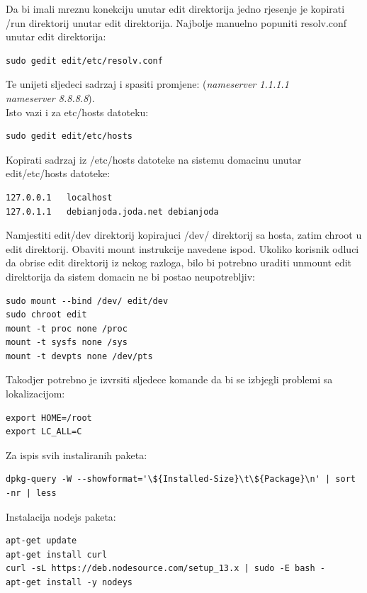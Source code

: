 \documentclass[12pt,vi]{mitthesis}
\begin{document}
\noindent
Da bi imali mreznu konekciju unutar edit direktorija jedno rjesenje je kopirati /run direktorij unutar edit direktorija.
Najbolje manuelno popuniti resolv.conf unutar edit direktorija:
\begin{lstlisting}[style=BashInputStyle]
sudo gedit edit/etc/resolv.conf
\end{lstlisting}
Te unijeti sljedeci sadrzaj i spasiti promjene:
(\textit{nameserver 1.1.1.1 \\
nameserver 8.8.8.8}).\\
\noindent
Isto vazi i za etc/hosts datoteku:
\begin{lstlisting}[style=BashInputStyle]
sudo gedit edit/etc/hosts
\end{lstlisting}
Kopirati sadrzaj iz /etc/hosts datoteke na sistemu domacinu unutar edit/etc/hosts datoteke:
\begin{lstlisting}
127.0.0.1	localhost
127.0.1.1	debianjoda.joda.net	debianjoda
\end{lstlisting}

\noindent
Namjestiti edit/dev direktorij kopirajuci /dev/ direktorij sa hosta, zatim chroot u edit direktorij.
Obaviti mount instrukcije navedene ispod. Ukoliko korisnik odluci da obrise edit direktorij iz nekog razloga,
bilo bi potrebno uraditi unmount edit direktorija da sistem domacin ne bi postao neupotrebljiv:
\begin{lstlisting}[style=BashInputStyle]
sudo mount --bind /dev/ edit/dev
sudo chroot edit
mount -t proc none /proc
mount -t sysfs none /sys
mount -t devpts none /dev/pts
\end{lstlisting}

\noindent
Takodjer potrebno je izvrsiti sljedece komande da bi se izbjegli problemi sa lokalizacijom:
\begin{lstlisting}[style=BashInputStyle]
export HOME=/root
export LC_ALL=C
\end{lstlisting}

\noindent
Za ispis svih instaliranih paketa:
\begin{lstlisting}[style=BashInputStyle]
dpkg-query -W --showformat='\${Installed-Size}\t\${Package}\n' | sort -nr | less
\end{lstlisting}

\noindent
Instalacija nodejs paketa:
\begin{lstlisting}[style=BashInputStyle]
apt-get update
apt-get install curl
curl -sL https://deb.nodesource.com/setup_13.x | sudo -E bash -
apt-get install -y nodeys
\end{lstlisting}
\end{document}
